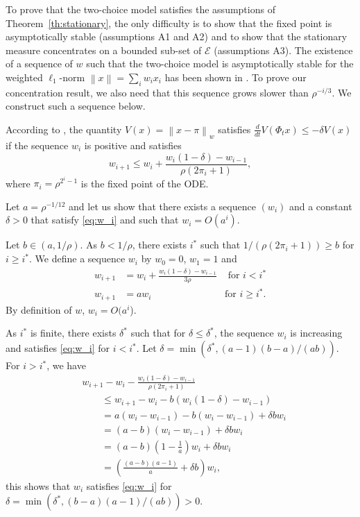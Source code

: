\documentclass[sigconf]{acmart}
\newcommand\E{\mathcal{E}}
\newcommand\norm[1]{\left\|#1\right\|}
\newcommand\dt{\frac{d}{dt}}
\newcommand\p[1]{\left(#1\right)}
\begin{document}
To prove that the two-choice model satisfies the assumptions of
Theorem~\ref{th:stationary}, the only difficulty is to show that the
fixed point is asymptotically stable (assumptions A1 and A2) and to
show that the stationary measure concentrates on a bounded sub-set of
$\E$ (assumptions A3).  The existence of a sequence of $w$ such that
the two-choice model is asymptotically stable for the weighted
$\ell_1$-norm $\norm{x}=\sum_i w_i x_i$ has been shown in
\cite[Theorem~3.6]{mitzenmacher1996power}. To prove our concentration
result, we also need that this sequence grows slower than
$\rho^{-i/3}$. We construct such a sequence below.

According to \cite[Proof of Theorem~3.6]{mitzenmacher1996power}, the
quantity $V(x)=\norm{x-\pi}_w$ satisfies
$\dt V(\Phi_tx)\le -\delta V(x)$ if the sequence $w_i$ is positive and
satisfies
\begin{equation}
  \label{eq:w_i}
  w_{i+1} \le w_i + \frac{w_i(1-\delta) - w_{i-1}}{\rho
    (2\pi_i+1)},
\end{equation}
where $\pi_i=\rho^{2^i-1}$ is the fixed point of the ODE. 

Let $a=\rho^{-1/12}$ 
and let us show that there exists a sequence
$(w_i)$ and a constant $\delta>0$ that satisfy \eqref{eq:w_i} and such
that $w_i=O(a^i)$.

Let $b\in(a,1/\rho)$. As $b<1/\rho$, there exists $i^*$ such
that $1/(\rho (2\pi_i+1))\ge b$ for $i\ge i^*$. We define a
sequence $w_i$ by $w_0=0$, $w_1=1$ and
\begin{align*}
  w_{i+1} &= w_i+\frac{w_i(1-\delta) - w_{i-1}}{3\rho} 
  &\text{ for $i<i^*$}\\
  w_{i+1} &= aw_i  &\text{for $i\ge i^*$}. 
\end{align*}
By definition of $w$, $w_i=O(a^i$).

As $i^*$ is finite, there exists $\delta^*$ such that for
$\delta\le\delta^*$, the sequence $w_i$ is increasing and satisfies
\eqref{eq:w_i} for $i<i^*$. Let
$\delta=\min(\delta^*,(a-1)(b-a)/(ab))$.  For $i>i^*$, we have
\begin{align*}
  &w_{i+1} - w_i - \frac{w_i(1-\delta)-w_{i-1}}{\rho(2\pi_i+1)} \\
  &\qquad\le w_{i+1}-w_i - b (w_i(1-\delta)-w_{i-1})\\
  &\qquad= a(w_i-w_{i-1}) - b (w_i-w_{i-1}) + \delta b w_{i}\\
  &\qquad= (a-b)(w_i-w_{i-1}) + \delta b w_i \\
  &\qquad= (a-b)\p{1-\frac1a} w_i + \delta b w_i \\
  &\qquad= \p{\frac{(a-b)(a-1)}{a} + \delta b} w_i,
\end{align*}
this shows that $w_i$ satisfies \eqref{eq:w_i} for
$\delta=\min(\delta^*,(b-a)(a-1)/(ab))>0$. 
\end{document}
